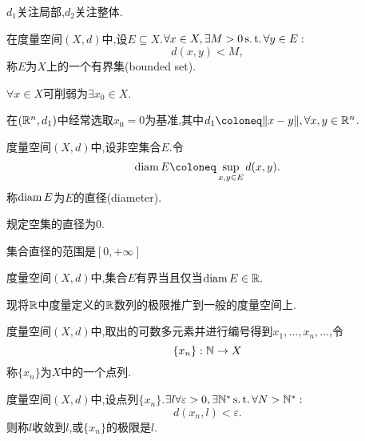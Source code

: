 \begin{remark}
    $d_1$关注局部,$d_2$关注整体.
\end{remark}

\begin{definition}
    [有界集的度量定义]
    在度量空间$(X,d)$中,设$E\subseteq X.$$\forall x\in X,\exists M>0\operatorname{s.t.}\forall y\in E:$
    \[d(x,y)<M,\]
    称$E$为$X$上的一个有界集(bounded set).
\end{definition}

\begin{remark}
    $\forall x\in X$可削弱为$\exists x_0\in X.$
\end{remark}

\begin{remark}
    在$(\mathbb{R}^n,d_1)$中经常选取$x_0=0$为基准,其中$d_1\coloneq\lVert x-y\rVert,\forall x,y\in\R^n$.
\end{remark}

\begin{definition}
    [集合的直径]
    度量空间$(X,d)$中,设非空集合$E$.令
    \[\odiam E\coloneq\sup_{x,y\in E}d(x,y).\]
    称$\operatorname{diam} E$为$E$的直径(diameter).
\end{definition}

\begin{remark}
    规定空集的直径为0.
\end{remark}

\begin{remark}
    集合直径的范围是$[0,+\infty]$
\end{remark}

\begin{proposition}
    [有界集的直径刻画]
    度量空间$(X,d)$中,集合$E$有界当且仅当$\operatorname{diam} E\in\mathbb{R}.$
\end{proposition}

现将$\mathbb{R}$中度量定义的$\mathbb{R}$数列的极限推广到一般的度量空间上.

\begin{definition}
    [度量空间中的点列]
    度量空间$(X,d)$中,取出的可数多元素并进行编号得到$x_1,\ldots,x_n,\ldots$,令
    \[\{x_n\}:\mathbb{N}\to X\]
    称$\{x_n\}$为$X$中的一个点列.
\end{definition}

\begin{proposition}
    [度量空间中点列极限的度量刻画]
    度量空间$(X,d)$中,设点列$\{x_n\}$.$\exists l\forall \varepsilon >0,\exists \mathbb{N}^*\operatorname{s.t.}\forall N>\mathbb{N}^*:$
    \[d(x_n,l)<\varepsilon.\]
    则称$l$收敛到$l$,或$\{x_n\}$的极限是$l$.
\end{proposition}

